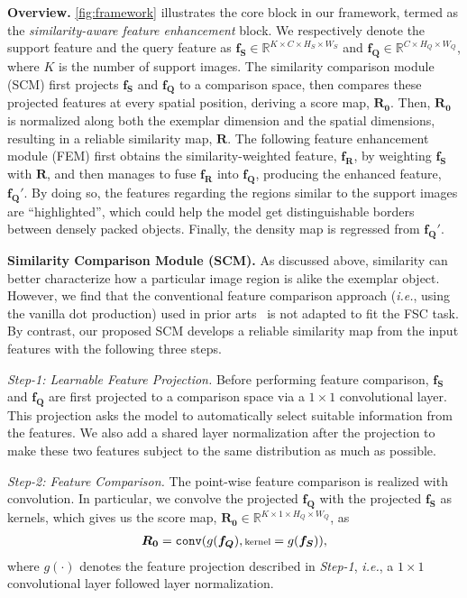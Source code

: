\documentclass[10pt,twocolumn,letterpaper]{article}
\newcommand{\fs}{\bm{f_S}}
\newcommand{\fq}{\bm{f_Q}}
\newcommand{\Rraw}{\bm{R_0}}
\newcommand{\Rnorm}{\bm{R}}
\newcommand{\fweight}{\bm{f_R}}
\newcommand{\fout}{\bm{f_Q'}}
\begin{document}
\vspace{2pt}\noindent\textbf{Overview.}
\cref{fig:framework} illustrates the core block in our framework, termed as the \textit{similarity-aware feature enhancement} block.
We respectively denote the support feature and the query feature as $\fs \in \mathbb{R}^{K \times C \times H_S \times W_S}$ and $\fq \in \mathbb{R}^{C \times H_Q \times W_Q}$, where $K$ is the number of support images. 
The similarity comparison module (SCM) first projects $\fs$ and $\fq$ to a comparison space, then compares these projected features at every spatial position, deriving a score map, $\Rraw$. 
Then, $\Rraw$ is normalized along both the exemplar dimension and the spatial dimensions, resulting in a reliable similarity map, $\Rnorm$. 
The following feature enhancement module (FEM) first obtains the similarity-weighted feature, $\fweight$, by weighting $\fs$ with $\Rnorm$, and then manages to fuse $\fweight$ into $\fq$, producing the enhanced feature, $\fout$.
By doing so, the features regarding the regions similar to the support images are ``highlighted'', which could help the model get distinguishable borders between densely packed objects. 
Finally, the density map is regressed from $\fout$.


\vspace{2pt}\noindent\textbf{Similarity Comparison Module (SCM).}
As discussed above, similarity can better characterize how a particular image region is alike the exemplar object.
However, we find that the conventional feature comparison approach (\textit{i.e.}, using the vanilla dot production) used in prior arts~\cite{cfocnet, famnet} is not adapted to fit the FSC task.
By contrast, our proposed SCM develops a reliable similarity map from the input features with the following three steps.


\textit{Step-1: Learnable Feature Projection.}
Before performing feature comparison, $\fs$ and $\fq$ are first projected to a comparison space via a $1\times1$ convolutional layer. 
This projection asks the model to automatically select suitable information from the features.
We also add a shared layer normalization after the projection to make these two features subject to the same distribution as much as possible.



\textit{Step-2: Feature Comparison.}
The point-wise feature comparison is realized with convolution.
In particular, we convolve the projected $\fq$ with the projected $\fs$ as kernels, which gives us the score map, $\Rraw \in \mathbb{R}^{K \times 1 \times H_Q \times W_Q}$, as
\begin{align}
  \scriptsize
  \Rraw = \mathtt{conv} ( g(\bm{\fq}), \text{kernel} = g(\bm{\fs})), \label{equ:relation}
\end{align}
where $g(\cdot)$ denotes the feature projection described in \textit{Step-1}, \textit{i.e.}, a $1\times1$ convolutional layer followed layer normalization.
\end{document}
